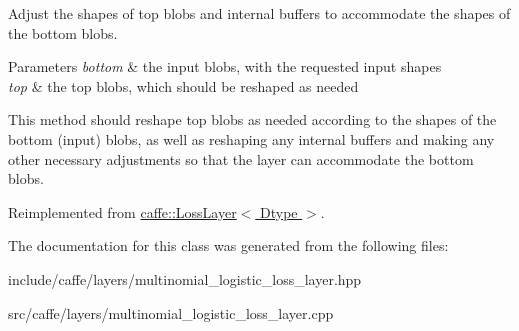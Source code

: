 Adjust the shapes of top blobs and internal buffers to accommodate the shapes of the bottom blobs. 


\begin{DoxyParams}{Parameters}
{\em bottom} & the input blobs, with the requested input shapes \\
\hline
{\em top} & the top blobs, which should be reshaped as needed\\
\hline
\end{DoxyParams}
This method should reshape top blobs as needed according to the shapes of the bottom (input) blobs, as well as reshaping any internal buffers and making any other necessary adjustments so that the layer can accommodate the bottom blobs. 

Reimplemented from \hyperlink{classcaffe_1_1LossLayer_ab15b7120ebc172274481f3732db78c9e}{caffe\+::\+Loss\+Layer$<$ Dtype $>$}.



The documentation for this class was generated from the following files\+:\begin{DoxyCompactItemize}
\item 
include/caffe/layers/multinomial\+\_\+logistic\+\_\+loss\+\_\+layer.\+hpp\item 
src/caffe/layers/multinomial\+\_\+logistic\+\_\+loss\+\_\+layer.\+cpp\end{DoxyCompactItemize}
